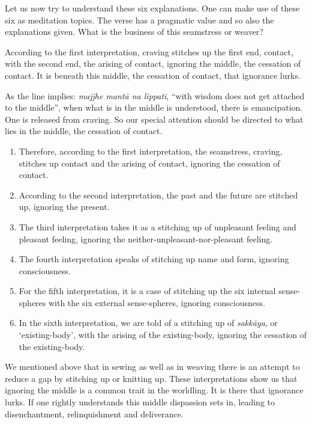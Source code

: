 Let us now try to understand these six explanations. One can make use of these six as meditation topics. The verse has a pragmatic value and so also the explanations given. What is the business of this seamstress or weaver?

According to the first interpretation, craving stitches up the first end, contact, with the second end, the arising of contact, ignoring the middle, the cessation of contact. It is beneath this middle, the cessation of contact, that ignorance lurks.

As the line implies: \emph{majjhe mantā na lippati}, ``with wisdom does not get attached to the middle'', when what is in the middle is understood, there is emancipation. One is released from craving. So our special attention should be directed to what lies in the middle, the cessation of contact.

\begin{enumerate}
\def\labelenumi{\arabic{enumi}.}
\item
  Therefore, according to the first interpretation, the seamstress, craving, stitches up contact and the arising of contact, ignoring the cessation of contact.
\item
  According to the second interpretation, the past and the future are stitched up, ignoring the present.
\item
  The third interpretation takes it as a stitching up of unpleasant feeling and pleasant feeling, ignoring the neither-unpleasant-nor-pleasant feeling.
\item
  The fourth interpretation speaks of stitching up name and form, ignoring consciousness.
\item
  For the fifth interpretation, it is a case of stitching up the six internal sense-spheres with the six external sense-spheres, ignoring consciousness.
\item
  In the sixth interpretation, we are told of a stitching up of \emph{sakkāya}, or `existing-body', with the arising of the existing-body, ignoring the cessation of the existing-body.
\end{enumerate}

We mentioned above that in sewing as well as in weaving there is an attempt to reduce a gap by stitching up or knitting up. These interpretations show us that ignoring the middle is a common trait in the worldling. It is there that ignorance lurks. If one rightly understands this middle dispassion sets in, leading to disenchantment, relinquishment and deliverance.

